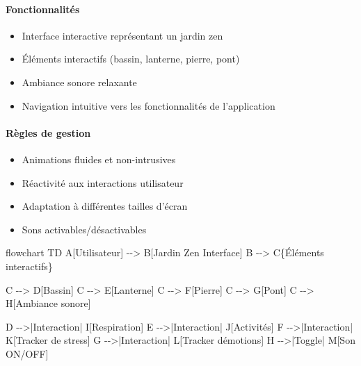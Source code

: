 \documentclass[
]{article}
\newenvironment{Shaded}{}{}
\newcommand{\NormalTok}[1]{#1}
\providecommand{\tightlist}{%
  \setlength{\itemsep}{0pt}\setlength{\parskip}{0pt}}
\begin{document}
\paragraph{Fonctionnalités}\label{fonctionnalituxe9s-5}

\begin{itemize}
\tightlist
\item
  Interface interactive représentant un jardin zen
\item
  Éléments interactifs (bassin, lanterne, pierre, pont)
\item
  Ambiance sonore relaxante
\item
  Navigation intuitive vers les fonctionnalités de l’application
\end{itemize}

\paragraph{Règles de gestion}\label{ruxe8gles-de-gestion-5}

\begin{itemize}
\tightlist
\item
  Animations fluides et non-intrusives
\item
  Réactivité aux interactions utilisateur
\item
  Adaptation à différentes tailles d’écran
\item
  Sons activables/désactivables
\end{itemize}

\begin{Shaded}
\begin{Highlighting}[]
\NormalTok{flowchart TD}
\NormalTok{    A[Utilisateur] {-}{-}\textgreater{} B[Jardin Zen Interface]}
\NormalTok{    B {-}{-}\textgreater{} C\{Éléments interactifs\}}
    
\NormalTok{    C {-}{-}\textgreater{} D[Bassin]}
\NormalTok{    C {-}{-}\textgreater{} E[Lanterne]}
\NormalTok{    C {-}{-}\textgreater{} F[Pierre]}
\NormalTok{    C {-}{-}\textgreater{} G[Pont]}
\NormalTok{    C {-}{-}\textgreater{} H[Ambiance sonore]}
    
\NormalTok{    D {-}{-}\textgreater{}|Interaction| I[Respiration]}
\NormalTok{    E {-}{-}\textgreater{}|Interaction| J[Activités]}
\NormalTok{    F {-}{-}\textgreater{}|Interaction| K[Tracker de stress]}
\NormalTok{    G {-}{-}\textgreater{}|Interaction| L[Tracker d\textquotesingle{}émotions]}
\NormalTok{    H {-}{-}\textgreater{}|Toggle| M[Son ON/OFF]}
\end{Highlighting}
\end{Shaded}
\end{document}
